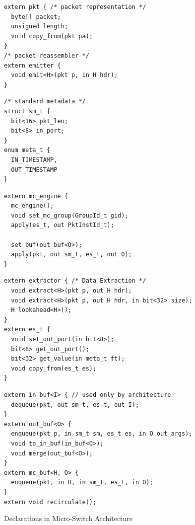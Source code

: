 \documentclass[letterpaper,twocolumn,10pt]{article}
\begin{document}
\begin{figure}
\begin{minipage}[t]{.38\textwidth}
\begin{lstlisting}[frame=none]
extern pkt { /* packet representation */
  byte[] packet; 
  unsigned length;
  void copy_from(pkt pa);
}
/* packet reassembler */
extern emitter {
  void emit<H>(pkt p, in H hdr);
}
\end{lstlisting}
\end{minipage}\vline
\hfill\begin{minipage}[t]{.22\textwidth}
\begin{lstlisting}[frame=none]
/* standard metadata */
struct sm_t { 
  bit<16> pkt_len;
  bit<8> in_port;
}
enum meta_t {
  IN_TIMESTAMP,
  OUT_TIMESTAMP 
}
\end{lstlisting}
\end{minipage}\vline
\hfill\begin{minipage}[t]{.35\textwidth}
\begin{lstlisting}[frame=none]
extern mc_engine {
  mc_engine();
  void set_mc_group(GroupId_t gid);
  apply(es_t, out PktInstId_t);
  
  set_buf(out_buf<O>);
  apply(pkt, out sm_t, es_t, out O);  
}
\end{lstlisting}
\end{minipage}
\begin{minipage}[t]{0.40\textwidth}
\begin{lstlisting}[frame=none]
extern extractor { /* Data Extraction */
  void extract<H>(pkt p, out H hdr);
  void extract<H>(pkt p, out H hdr, in bit<32> size);
  H lookahead<H>();
}
extern es_t {
  void set_out_port(in bit<8>);
  bit<8> get_out_port();
  bit<32> get_value(in meta_t ft);
  void copy_from(es_t es);
}
\end{lstlisting}
\end{minipage}\vline
\hfill\noindent\begin{minipage}[t]{0.57\textwidth}
\begin{lstlisting}[frame=none]
extern in_buf<I> { // used only by architecture
  dequeue(pkt, out sm_t, es_t, out I);
}
extern out_buf<O> {
  enqueue(pkt p, in sm_t sm, es_t es, in O out_args);
  void to_in_buf(in_buf<O>);
  void merge(out_buf<O>);
}
extern mc_buf<H, O> {
  enqueue(pkt, in H, in sm_t, es_t, in O);
}
extern void recirculate();
\end{lstlisting}
\end{minipage}
\caption{Declarations in Micro-Switch Architecture}
\label{fig:micro-switch-architecture}
\end{figure}
\end{document}

